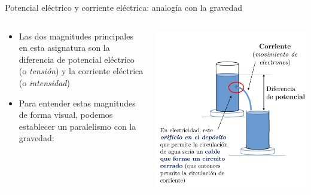\documentclass[aspectratio=169, xcolor={usenames,svgnames,dvipsnames}]{beamer}
\begin{document}

\begin{frame}{Potencial eléctrico y corriente eléctrica: \hspace{5mm}analogía con la gravedad}
    \begin{columns}
    \begin{column}{0.5\columnwidth}

        \vspace{-25mm}
        
        \begin{itemize}
         \item Las dos magnitudes principales en esta asignatura son la diferencia de \alert{potencial eléctrico} (o \textit{tensión}) y la \alert{corriente eléctrica} (o \textit{intensidad})

        \vspace{5mm}
        
        \item Para entender estas magnitudes de forma visual, podemos establecer un \alert{paralelismo con la gravedad}:
        \end{itemize}
    \end{column}  
    \begin{column}{0.5\columnwidth}
        \vspace{5mm}
        
        \includegraphics[height=0.9\textheight]{../figs/analogia_gravedad2.pdf}
    \end{column}
    \end{columns}
    
    
\end{frame}
\end{document}
